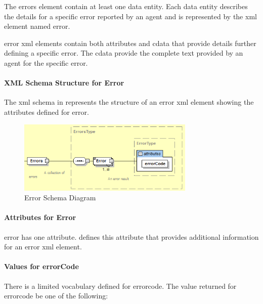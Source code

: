 The \gls{errors} element \MUST contain at least one \gls{data entity}.  Each \gls{data entity} describes the details for a specific error reported by an \gls{agent} and is represented by the \gls{xml} element named \gls{error}.

\gls{error} \gls{xml} elements \MAY contain both attributes and \gls{cdata} that provide details further defining a specific error.  The \gls{cdata} \MAY provide the complete text provided by an \gls{agent} for the specific error.  

\paragraph{XML Schema Structure for Error}\mbox{}

The \gls{xml schema} in  represents the structure of an \gls{error} \gls{xml} element showing the attributes defined for \gls{error}.

\begin{figure}[ht]
  \centering
  \includegraphics[width=0.75\textwidth]{figures/error-schema-diagram.png}
  \caption{Error Schema Diagram}
  \label{fig:error-schema-diagram}
\end{figure}

\FloatBarrier

\paragraph{Attributes for Error}\mbox{}

\gls{error} has one attribute.   defines this attribute that provides additional information for an \gls{error} \gls{xml} element.   



\paragraph{Values for errorCode}\mbox{}

There is a limited vocabulary defined for \gls{errorcode}.  The value returned for \gls{errorcode} \MUST be one of the following:

